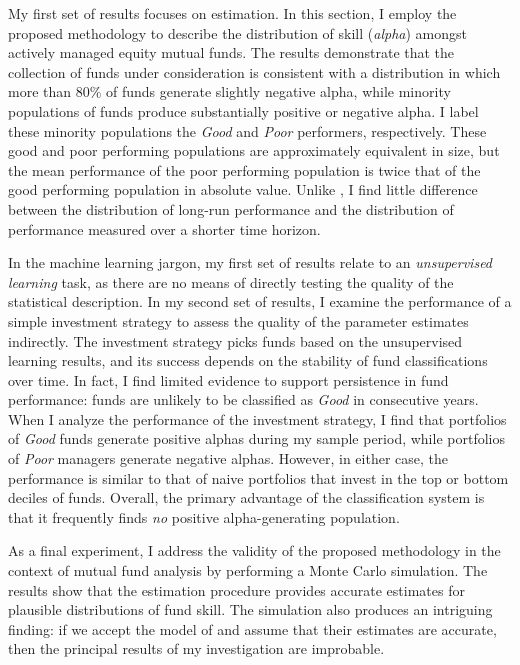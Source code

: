 	My first set of results focuses on estimation. In this section, I employ the proposed methodology to describe the distribution of skill (\textit{alpha}) amongst actively managed equity mutual funds. The results demonstrate that the collection of funds under consideration is consistent with a distribution in which more than 80\% of funds generate slightly negative alpha, while minority populations of funds produce substantially positive or negative alpha. I label these minority populations the \textit{Good} and \textit{Poor} performers, respectively. These good and poor performing populations are approximately equivalent in size, but the mean performance of the poor performing population is twice that of the good performing population in absolute value. Unlike \citet{Barras2010}, I find little difference between the distribution of long-run performance and the distribution of performance measured over a shorter time horizon.

	In the machine learning jargon, my first set of results relate to an \textit{unsupervised learning} task, as there are no means of directly testing the quality of the statistical description. In my second set of results, I examine the performance of a simple investment strategy to assess the quality of the parameter estimates indirectly. The investment strategy picks funds based on the unsupervised learning results, and its success depends on the stability of fund classifications over time. In fact, I find limited evidence to support persistence in fund performance: funds are unlikely to be classified as \textit{Good} in consecutive years. When I analyze the performance of the investment strategy, I find that portfolios of \textit{Good} funds generate positive alphas during my sample period, while portfolios of \textit{Poor} managers generate negative alphas. However, in either case, the performance is similar to that of naive portfolios that invest in the top or bottom deciles of funds. Overall, the primary advantage of the classification system is that it frequently finds \textit{no} positive alpha-generating population.

	As a final experiment, I address the validity of the proposed methodology in the context of mutual fund analysis by performing a Monte Carlo simulation. The results show that the estimation procedure provides accurate estimates for plausible distributions of fund skill. The simulation also produces an intriguing finding: if we accept the model of \citet{Barras2010} and assume that their estimates are accurate, then the principal results of my investigation are improbable.

